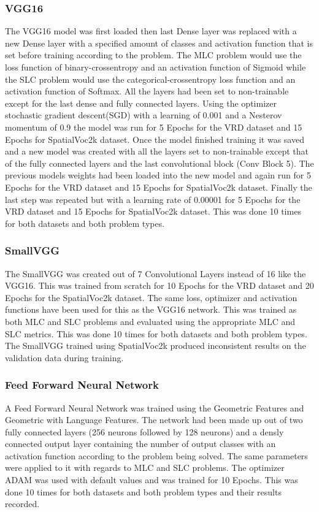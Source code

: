 \documentclass{IEEEtran}
\begin{document}
\subsubsection{VGG16}
The VGG16 model was first loaded then last Dense layer was replaced with a new Dense layer with a specified amount of classes and activation function that is set before training according to the problem. The MLC problem would use the loss function of binary-crossentropy and an activation function of Sigmoid while the SLC problem would use the categorical-crossentropy loss function and an activation function of Softmax. All the layers had been set to non-trainable except for the last dense and fully connected layers. Using the optimizer stochastic gradient descent(SGD) with a learning of 0.001 and a Nesterov momentum of 0.9 the model was run for 5 Epochs for the VRD dataset and 15 Epochs for SpatialVoc2k dataset. Once the model finished training it was saved and a new model was created with all the layers set to non-trainable except that of the fully connected layers and the last convolutional block (Conv Block 5). The previous models weights had been loaded into the new model and again run for 5 Epochs for the VRD dataset and 15 Epochs for SpatialVoc2k dataset. Finally the last step was repeated but with a learning rate of 0.00001 for 5 Epochs for the VRD dataset and 15 Epochs for SpatialVoc2k dataset. This was done 10 times for both datasets and both problem types.

\subsubsection{SmallVGG}
The SmallVGG was created out of 7 Convolutional Layers instead of 16 like the VGG16. This was trained from scratch for 10 Epochs for the VRD dataset and 20 Epochs for the SpatialVoc2k dataset. The same loss, optimizer and activation functions have been used for this as the VGG16 network. This was trained as both MLC and SLC problems and evaluated using the appropriate MLC and SLC metrics. This was done 10 times for both datasets and both problem types. The SmallVGG trained using SpatialVoc2k produced inconsistent results on the validation data during training.

\subsubsection{Feed Forward Neural Network}
A Feed Forward Neural Network was trained using the Geometric Features and Geometric with Language Features. The network had been made up out of two fully connected layers (256 neurons followed by 128 neurons) and a densly connected output layer containing the number of output classes with an activation function according to the problem being solved. The same parameters were applied to it with regards to MLC and SLC problems. The optimizer ADAM was used with default values and was trained for 10 Epochs. This was done 10 times for both datasets and both problem types and their results recorded.
\end{document}
